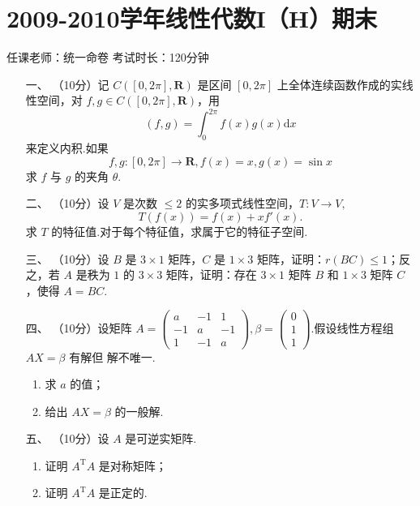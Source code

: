 \section*{2009-2010学年线性代数I（H）期末}

\begin{center}
    任课老师：统一命卷\hspace{4em} 考试时长：120分钟
\end{center}

\begin{enumerate}

    \item [一、]（10分）记 $C([0,2\pi],\mathbf{R})$ 是区间 $[0,2\pi]$ 上全体连续函数作成的实线性空间，对 $f,g \in C([0,2\pi],\mathbf{R})$，用
    \[(f,g) = \displaystyle\int_0^{2\pi}f(x)g(x)\mathrm{d}x\]
    来定义内积.如果
    \[f,g:[0,2\pi] \to \mathbf{R},f(x)=x,g(x)=\sin x\]
    求 $f$ 与 $g$ 的夹角 $\theta.$
    \item[二、]（10分）设 $V$ 是次数 $\leq 2$ 的实多项式线性空间，$T:V\to V,$
    \[T(f(x)) = f(x) + xf'(x).\]
    求 $T$ 的特征值.对于每个特征值，求属于它的特征子空间.
    \item[三、]（10分）设 $B$ 是 $3\times 1$ 矩阵，$C$ 是 $1\times 3$ 矩阵，证明：$r(BC)\leq 1$；反之，若 $A$ 是秩为 $1$
    的 $3\times 3$ 矩阵，证明：存在 $3\times 1$ 矩阵 $B$ 和 $1\times 3$ 矩阵 $C$，使得 $A=BC.$
    \item[四、]（10分）设矩阵 $A=\begin{pmatrix}a & -1 & 1 \\ -1 & a & -1 \\ 1 & -1 & a\end{pmatrix},\beta =\begin{pmatrix}0 \\ 1 \\ 1\end{pmatrix}.$假设线性方程组 $AX=\beta$ 有解但
    解不唯一.
    \begin{enumerate}[label=(\arabic*)]
        \item 求 $a$ 的值；
        \item 给出 $AX=\beta$ 的一般解.
    \end{enumerate}
    \item[五、]（10分）设 $A$ 是可逆实矩阵.
    \begin{enumerate}[label=(\arabic*)]
        \item 证明 $A^{\mathrm{T}}A$ 是对称矩阵；
        \item 证明 $A^{\mathrm{T}}A$ 是正定的.

\end{enumerate}
\end{enumerate}
